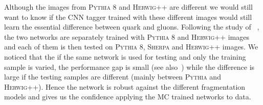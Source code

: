
Although the images from \textsc{Pythia} 8 and \textsc{Herwig++} are different
we would still want to know if the CNN tagger trained with these different images
would still learn the essential difference between quark and gluons. Following the study
of ~\cite{Barnard:2016qma}, the two networks are separately trained with \textsc{Pythia} 8 and \textsc{Herwig++}
images and each of them is then tested on \textsc{Pythia} 8, \textsc{Sherpa} and \textsc{Herwig++}
images. We noticed that the  if the same network is used for testing and only the training sample is varied, 
the performance gap is small (see also~\cite{Komiske:2016rsd}) while the difference is large
if the testing samples are different (mainly between \textsc{Pythia} and \textsc{Herwig++}).
Hence the network is robust against the different fragmentation models and gives
us the confidence applying the MC trained networks to data.

